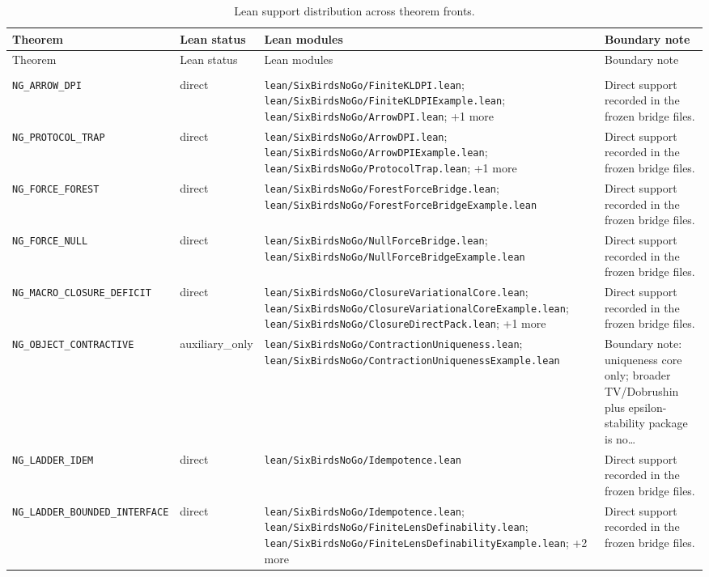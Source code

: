 {\scriptsize
\begin{longtable}{>{\raggedright\arraybackslash}p{} >{\raggedright\arraybackslash}p{} >{\raggedright\arraybackslash}p{} >{\raggedright\arraybackslash}p{}}
\caption{Lean support distribution across theorem fronts.}\label{tab:lean-map}\\
\toprule
Theorem & Lean status & Lean modules & Boundary note\\
\midrule
\endfirsthead
\toprule
Theorem & Lean status & Lean modules & Boundary note\\
\midrule
\endhead
\midrule
\multicolumn{4}{r}{Continued on next page}\\
\midrule
\endfoot
\bottomrule
\endlastfoot
\texttt{NG\_ARROW\_DPI} & direct & \texttt{lean/SixBirdsNoGo/FiniteKLDPI.lean}; \texttt{lean/SixBirdsNoGo/FiniteKLDPIExample.lean}; \texttt{lean/SixBirdsNoGo/ArrowDPI.lean}; +1 more & Direct support recorded in the frozen bridge files.\\
\texttt{NG\_PROTOCOL\_TRAP} & direct & \texttt{lean/SixBirdsNoGo/ArrowDPI.lean}; \texttt{lean/SixBirdsNoGo/ArrowDPIExample.lean}; \texttt{lean/SixBirdsNoGo/ProtocolTrap.lean}; +1 more & Direct support recorded in the frozen bridge files.\\
\texttt{NG\_FORCE\_FOREST} & direct & \texttt{lean/SixBirdsNoGo/ForestForceBridge.lean}; \texttt{lean/SixBirdsNoGo/ForestForceBridgeExample.lean} & Direct support recorded in the frozen bridge files.\\
\texttt{NG\_FORCE\_NULL} & direct & \texttt{lean/SixBirdsNoGo/NullForceBridge.lean}; \texttt{lean/SixBirdsNoGo/NullForceBridgeExample.lean} & Direct support recorded in the frozen bridge files.\\
\texttt{NG\_MACRO\_CLOSURE\_DEFICIT} & direct & \texttt{lean/SixBirdsNoGo/ClosureVariationalCore.lean}; \texttt{lean/SixBirdsNoGo/ClosureVariationalCoreExample.lean}; \texttt{lean/SixBirdsNoGo/ClosureDirectPack.lean}; +1 more & Direct support recorded in the frozen bridge files.\\
\texttt{NG\_OBJECT\_CONTRACTIVE} & auxiliary\_only & \texttt{lean/SixBirdsNoGo/ContractionUniqueness.lean}; \texttt{lean/SixBirdsNoGo/ContractionUniquenessExample.lean} & Boundary note: uniqueness core only; broader TV/Dobrushin plus epsilon-stability package is no…\\
\texttt{NG\_LADDER\_IDEM} & direct & \texttt{lean/SixBirdsNoGo/Idempotence.lean} & Direct support recorded in the frozen bridge files.\\
\texttt{NG\_LADDER\_BOUNDED\_INTERFACE} & direct & \texttt{lean/SixBirdsNoGo/Idempotence.lean}; \texttt{lean/SixBirdsNoGo/FiniteLensDefinability.lean}; \texttt{lean/SixBirdsNoGo/FiniteLensDefinabilityExample.lean}; +2 more & Direct support recorded in the frozen bridge files.\\
\end{longtable}
}
